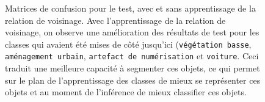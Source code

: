 \documentclass[a4paper, onecolumn, 11pt]{article}
\begin{document}
\begin{figure}[p]
    \centering
    \qquad
    \caption{Matrices de confusion pour le test, avec et sans apprentissage de la relation de voisinage. Avec l'apprentissage de la relation de voisinage, on observe une amélioration des résultats de test pour les classes qui avaient été mises de côté jusqu'ici (\texttt{végétation basse}, \texttt{aménagement urbain}, \texttt{artefact de numérisation} et \texttt{voiture}. Ceci traduit une meilleure capacité à segmenter ces objets, ce qui permet sur le plan de l'apprentissage des classes de mieux se représenter ces objets et au moment de l'inférence de mieux classifier ces objets.}
    \label{fig:neighbourhood}
\end{figure}
\end{document}
